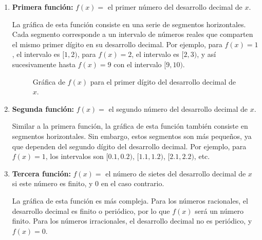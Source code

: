 \begin{enumerate}
    \item \textbf{Primera función:} $f(x) =$ el primer número del desarrollo decimal de $x$.
    
    La gráfica de esta función consiste en una serie de segmentos horizontales. Cada segmento corresponde a un intervalo de números reales que comparten el mismo primer dígito en su desarrollo decimal. Por ejemplo, para $f(x) = 1$, el intervalo es $[1, 2)$, para $f(x) = 2$, el intervalo es $[2, 3)$, y así sucesivamente hasta $f(x) = 9$ con el intervalo $[9, 10)$.

    \begin{figure}[h!]
    \centering
    \caption{Gráfica de $f(x)$ para el primer dígito del desarrollo decimal de $x$.}
    \label{fig:primer_digito}
    \end{figure}

    \item \textbf{Segunda función:} $f(x) =$ el segundo número del desarrollo decimal de $x$.
    
    Similar a la primera función, la gráfica de esta función también consiste en segmentos horizontales. Sin embargo, estos segmentos son más pequeños, ya que dependen del segundo dígito del desarrollo decimal. Por ejemplo, para $f(x) = 1$, los intervalos son $[0.1, 0.2)$, $[1.1, 1.2)$, $[2.1, 2.2)$, etc.

    \item \textbf{Tercera función:} $f(x) =$ el número de sietes del desarrollo decimal de $x$ si este número es finito, y $0$ en el caso contrario.
    
    La gráfica de esta función es más compleja. Para los números racionales, el desarrollo decimal es finito o periódico, por lo que $f(x)$ será un número finito. Para los números irracionales, el desarrollo decimal no es periódico, y $f(x) = 0$.


\end{enumerate}
